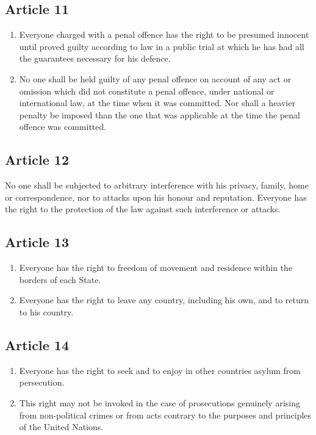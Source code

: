 \documentclass[
  titlepage,
  openright,
  DIV=calc,
  toc=listof,
  listof=nochaptergap]{scrbook}
\begin{document}
\subsection{Article 11}\label{article-11}

\begin{enumerate}
\def\labelenumi{\arabic{enumi}.}
\item
  Everyone charged with a penal offence has the right to be presumed
  innocent until proved guilty according to law in a public trial at
  which he has had all the guarantees necessary for his defence.
\item
  No one shall be held guilty of any penal offence on account of any act
  or omission which did not constitute a penal offence, under national
  or international law, at the time when it was committed. Nor shall a
  heavier penalty be imposed than the one that was applicable at the
  time the penal offence was committed.
\end{enumerate}

\subsection{Article 12}\label{article-12}

No one shall be subjected to arbitrary interference with his privacy,
family, home or correspondence, nor to attacks upon his honour and
reputation. Everyone has the right to the protection of the law against
such interference or attacks.

\subsection{Article 13}\label{article-13}

\begin{enumerate}
\def\labelenumi{\arabic{enumi}.}
\item
  Everyone has the right to freedom of movement and residence within the
  borders of each State.
\item
  Everyone has the right to leave any country, including his own, and to
  return to his country.
\end{enumerate}

\subsection{Article 14}\label{article-14}

\begin{enumerate}
\def\labelenumi{\arabic{enumi}.}
\item
  Everyone has the right to seek and to enjoy in other countries asylum
  from persecution.
\item
  This right may not be invoked in the case of prosecutions genuinely
  arising from non-political crimes or from acts contrary to the
  purposes and principles of the United Nations.
\end{enumerate}
\end{document}
